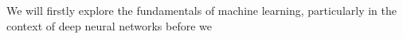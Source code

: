 We will firstly explore the fundamentals of machine learning, particularly in the context of deep neural networks before we